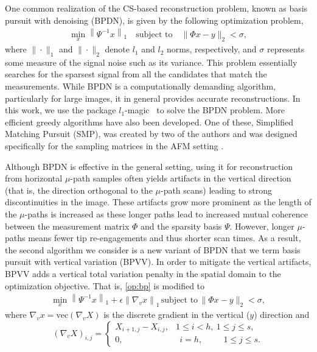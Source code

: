 \documentclass[twocolumn,twoside]{IEEEtran/IEEEtran}
\begin{document}
One common realization of the CS-based reconstruction problem, known as basis
pursuit with denoising (BPDN), is given by the following optimization problem,
\begin{equation}\label{op:bp}
  \begin{aligned}
	\min_{x} \left \| \Psi^{-1}x \right \|_1\quad \text{subject to}\quad \|\Phi
    x - y\|_2 < \sigma,
  \end{aligned}
\end{equation}
where $\| \cdot \|_1$ and $\| \cdot \|_2$ denote $l_1$ and $l_2$ norms,
respectively, and $\sigma$ represents some measure of the signal noise such as
its variance. This problem essentially searches for the sparsest signal from all
the candidates that match the measurements. While BPDN is a computationally
demanding algorithm, particularly for large images, it in general provides
accurate reconstructions. In this work, we use the package
$l_1$-magic~\cite{l1magic} to solve the BPDN problem. More efficient greedy
algorithms have also been developed. One of these, Simplified Matching Pursuit
(SMP), was created by two of the authors and was designed specifically for the
sampling matrices in the AFM setting \cite{Luo:2015tu}.
	
Although BPDN is effective in the general setting, using it for reconstruction
from horizontal $\mu$-path samples often yields artifacts in the vertical
direction (that is, the direction orthogonal to the $\mu$-path scans) leading to
strong discontinuities in the image. These artifacts grow more prominent as the
length of the $\mu$-paths is increased \cite{maxwell2014compressed} as these
longer paths lead to increased mutual coherence between the measurement matrix
$\Phi$ and the sparsity basis $\Psi$. However, longer $\mu$-paths means fewer
tip re-engagements and thus shorter scan times. As a result, the second
algorithm we consider is a new variant of BPDN that we term basis pursuit with
vertical variation (BPVV). In order to mitigate the vertical artifacts, BPVV
adds a vertical total variation penalty in the spatial domain to the
optimization objective. That is, \eqref{op:bp} is modified to
\begin{equation}\label{op:bp_tv}
  \begin{aligned}
	\min_{x} \left \| \Psi^{-1}x \right \|_1 + \epsilon \left \| \nabla_v x
    \right \|_1 \, \text{subject to} \, \| \Phi x - y \|_2 < \sigma,
  \end{aligned}
\end{equation}
where ${\nabla_v x=\text{vec}(\nabla_v X)}$ is the discrete gradient in the
vertical ($y$) direction and
\begin{equation}
  (\nabla_v X)_{i,j} = 
  \begin{cases}
    X_{i+1,j} - X_{i,j}, & 1\leq i<h,~ 1\leq j\leq s,\\
    0, & \phantom{:}i=h,~\phantom{:::::} 1\leq j\leq s.
  \end{cases}
\end{equation}
\end{document}
